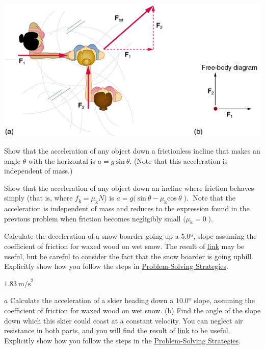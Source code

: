 \documentclass[
]{book}
\begin{document}
\includegraphics{images/Figure 04_01_01a.jpg}

\hypertarget{fs-id1426454}{}
\leavevmode{}%
Show that the acceleration of any object down a frictionless incline
that makes an angle \(\theta{}\) with the horizontal is
\({{a = g}\ \text{sin}\ \theta}{}\). (Note that this acceleration is
independent of mass.)

\hypertarget{fs-id1395614}{}
\leavevmode{}%
Show that the acceleration of any object down an incline where friction
behaves simply (that is, where \({{f_{\text{k}} = \mu_{\text{k}}}N}{}\))
is
\({{a = g}(\ \text{sin}\ {\theta - \mu_{\text{k}}}\text{cos}\ \theta\operatorname{).}}{}\)
Note that the acceleration is independent of mass and reduces to the
expression found in the previous problem when friction becomes
negligibly small \({({\mu_{\text{k}} = 0}\operatorname{).}}{}\)

\hypertarget{fs-id1555366}{}
\leavevmode{}%
Calculate the deceleration of a snow boarder going up a \(5.0º{}\), slope
assuming the coefficient of friction for waxed wood on wet snow. The
result of \protect\hyperlink{fs-id1395614}{link} may be useful,
but be careful to consider the fact that the snow boarder is going
uphill. Explicitly show how you follow the steps in \href{/m54861}{Problem-Solving
Strategies}.

\leavevmode{}%
\({1\text{.}\text{83}\ \text{m/s}^{2}}{}\)

\hypertarget{fs-id1453574}{}
\leavevmode{}%
\(a\) Calculate the acceleration of a skier heading down a
\({\text{10}\text{.}0º}{}\) slope, assuming the coefficient of friction
for waxed wood on wet snow. (b) Find the angle of the slope down which
this skier could coast at a constant velocity. You can neglect air
resistance in both parts, and you will find the result of
\protect\hyperlink{fs-id1395614}{link} to be useful. Explicitly
show how you follow the steps in the \href{/m54861}{Problem-Solving
Strategies}.
\end{document}
